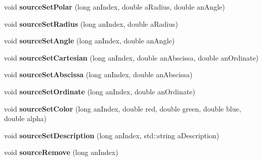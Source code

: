\begin{DoxyCompactItemize}
\item 
\hypertarget{class_sources_manager_a69ef810ef10e92a8367f6fd879c1c068}{void {\bfseries source\-Set\-Polar} (long an\-Index, double a\-Radius, double an\-Angle)}\label{class_sources_manager_a69ef810ef10e92a8367f6fd879c1c068}

\item 
\hypertarget{class_sources_manager_a8f724b1c958c4f376ed19cd197005027}{void {\bfseries source\-Set\-Radius} (long an\-Index, double a\-Radius)}\label{class_sources_manager_a8f724b1c958c4f376ed19cd197005027}

\item 
\hypertarget{class_sources_manager_af2156a8e9477d9c3c3d1c26f30f99962}{void {\bfseries source\-Set\-Angle} (long an\-Index, double an\-Angle)}\label{class_sources_manager_af2156a8e9477d9c3c3d1c26f30f99962}

\item 
\hypertarget{class_sources_manager_aef5208c889dc53985f0735988154bfd0}{void {\bfseries source\-Set\-Cartesian} (long an\-Index, double an\-Abscissa, double an\-Ordinate)}\label{class_sources_manager_aef5208c889dc53985f0735988154bfd0}

\item 
\hypertarget{class_sources_manager_a588789cc82c2a3ef1714a3cc67f901d9}{void {\bfseries source\-Set\-Abscissa} (long an\-Index, double an\-Abscissa)}\label{class_sources_manager_a588789cc82c2a3ef1714a3cc67f901d9}

\item 
\hypertarget{class_sources_manager_a6903bd12bb796aacee661128afd8f860}{void {\bfseries source\-Set\-Ordinate} (long an\-Index, double an\-Ordinate)}\label{class_sources_manager_a6903bd12bb796aacee661128afd8f860}

\item 
\hypertarget{class_sources_manager_a57fee2939359839246ba793800e440d4}{void {\bfseries source\-Set\-Color} (long an\-Index, double red, double green, double blue, double alpha)}\label{class_sources_manager_a57fee2939359839246ba793800e440d4}

\item 
\hypertarget{class_sources_manager_ae871bb7858c67606d5aa3ca03e3b3a07}{void {\bfseries source\-Set\-Description} (long an\-Index, std\-::string a\-Description)}\label{class_sources_manager_ae871bb7858c67606d5aa3ca03e3b3a07}

\item 
\hypertarget{class_sources_manager_ad3a8f25a5e36b1451ccdaa9001eba476}{void {\bfseries source\-Remove} (long an\-Index)}\label{class_sources_manager_ad3a8f25a5e36b1451ccdaa9001eba476}


\end{DoxyCompactItemize}
